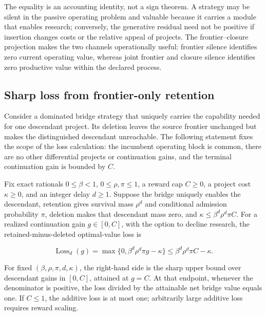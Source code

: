 The equality is an accounting identity, not a sign theorem. A strategy may
be silent in the passive operating problem and valuable because it carries a
module that enables research; conversely, the generative residual need not be
positive if insertion changes costs or the relative appeal of projects. The
frontier--closure projection makes the two channels operationally useful:
frontier silence identifies zero current operating value, whereas joint
frontier and closure silence identifies zero productive value within the
declared process.

\subsection{Sharp loss from frontier-only retention}

Consider a dominated bridge strategy that uniquely carries the capability
needed for one descendant project. Its deletion leaves the source frontier
unchanged but makes the distinguished descendant unreachable. The following
statement fixes the scope of the loss calculation: the incumbent operating
block is common, there are no other differential projects or continuation
gains, and the terminal continuation gain is bounded by \(C\).

\begin{theorem}
\label{thm:normalized-frontier-pruning-loss}
Fix exact rationals \(0\le\beta<1\), \(0\le\rho,\pi\le1\), a reward cap
\(C\ge0\), a project cost \(\kappa\ge0\), and an integer delay \(d\ge1\).
Suppose the bridge uniquely enables the descendant, retention gives survival
mass \(\rho^d\) and conditional admission probability \(\pi\), deletion makes
that descendant mass zero, and
\(\kappa\le\beta^d\rho^d\pi C\). For a realized continuation gain
\(g\in[0,C]\), with the option to decline research, the
retained-minus-deleted optimal-value loss is

\begin{equation}
 \operatorname{Loss}_d(g)
 =\max\{0,\beta^d\rho^d\pi g-\kappa\}
 \leq\beta^d\rho^d\pi C-\kappa.
 \label{eq:normalized-pruning-loss}
\end{equation}

For fixed \((\beta,\rho,\pi,d,\kappa)\), the right-hand side is the sharp
upper bound over descendant gains in \([0,C]\), attained at \(g=C\).
At that endpoint, whenever the denominator is positive, the loss divided by
the attainable net bridge value equals one.
If \(C\le1\), the additive loss is at most one; arbitrarily large additive
loss requires reward scaling.
\end{theorem}

